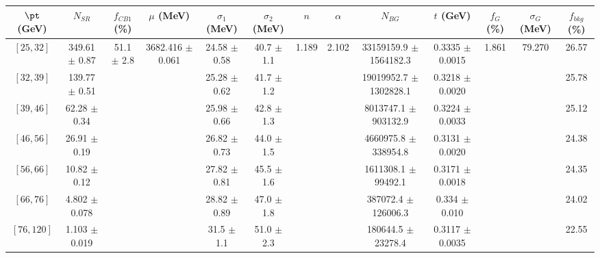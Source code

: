 \begin{tabular}{c||c|c|c|c|c|c|c|c|c|c|c||c}
$\pt$ (GeV) & $N_{SR}$ & $f_{CB1}$ (\%) & $\mu$ (MeV) & $\sigma_1$ (MeV) & $\sigma_2$ (MeV) & $n$ & $\alpha$ & $N_{BG}$ & $t$ (GeV) & $f_G$ (\%) & $\sigma_G$ (MeV) & $f_{bkg}$ (\%) \\
\hline
$[25, 32]$ & 349.61 $\pm$ 0.87 & \multirow{7}{*}{51.1 $\pm$ 2.8} & \multirow{7}{*}{3682.416 $\pm$ 0.061} & 24.58 $\pm$ 0.58 & 40.7 $\pm$ 1.1 & \multirow{7}{*}{1.189} & \multirow{7}{*}{2.102} & 33159159.9 $\pm$ 1564182.3 & 0.3335 $\pm$ 0.0015 & \multirow{7}{*}{1.861} & \multirow{7}{*}{79.270} & 26.57\\
$[32, 39]$ & 139.77 $\pm$ 0.51 &  &  & 25.28 $\pm$ 0.62 & 41.7 $\pm$ 1.2 &  &  & 19019952.7 $\pm$ 1302828.1 & 0.3218 $\pm$ 0.0020 &  &  & 25.78\\
$[39, 46]$ & 62.28 $\pm$ 0.34 &  &  & 25.98 $\pm$ 0.66 & 42.8 $\pm$ 1.3 &  &  & 8013747.1 $\pm$ 903132.9 & 0.3224 $\pm$ 0.0033 &  &  & 25.12\\
$[46, 56]$ & 26.91 $\pm$ 0.19 &  &  & 26.82 $\pm$ 0.73 & 44.0 $\pm$ 1.5 &  &  & 4660975.8 $\pm$ 338954.8 & 0.3131 $\pm$ 0.0020 &  &  & 24.38\\
$[56, 66]$ & 10.82 $\pm$ 0.12 &  &  & 27.82 $\pm$ 0.81 & 45.5 $\pm$ 1.6 &  &  & 1611308.1 $\pm$ 99492.1 & 0.3171 $\pm$ 0.0018 &  &  & 24.35\\
$[66, 76]$ & 4.802 $\pm$ 0.078 &  &  & 28.82 $\pm$ 0.89 & 47.0 $\pm$ 1.8 &  &  & 387072.4 $\pm$ 126006.3 & 0.334 $\pm$ 0.010 &  &  & 24.02\\
$[76, 120]$ & 1.103 $\pm$ 0.019 &  &  & 31.5 $\pm$ 1.1 & 51.0 $\pm$ 2.3 &  &  & 180644.5 $\pm$ 23278.4 & 0.3117 $\pm$ 0.0035 &  &  & 22.55\\
\end{tabular}
